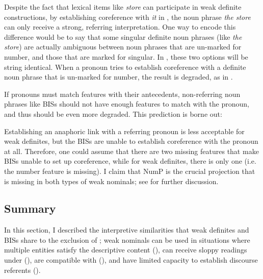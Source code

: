 \documentclass[output=paper,
modfonts
]{langscibook}
\begin{document}
Despite the fact that lexical items like \textit{store} can participate in weak definite constructions, by establishing coreference with \textit{it} in , the noun phrase \textit{the store} can only receive a strong, referring interpretation. One way to encode this difference would be to say that some singular definite noun phrases (like \textit{the store}) are actually ambiguous between noun phrases that are un-marked for number, and those that are marked for singular. In , these two options will be string identical. When a pronoun tries to establish coreference with a definite noun phrase that is un-marked for number, the result is degraded, as in .

If pronouns must match features with their antecedents, non-referring noun phrases like BISs should not have enough features to match with the pronoun, and thus should be even more degraded. This prediction is borne out:

\begin{exe}
\end{exe}

Establishing an anaphoric link with a referring pronoun is less acceptable for weak definites, but the BISs are unable to establish coreference with the pronoun at all. Therefore, one could assume that there are two missing features that make BISs unable to set up coreference, while for weak definites, there is only one (i.e. the number feature is missing). I claim that {Num}P is the crucial projection that is missing in both types of weak nominals; see  for further discussion.


\subsection{Summary}

In this section, I described the interpretive similarities that weak definites and BISs share to the exclusion of ; weak nominals can be used in situations where multiple entities satisfy the descriptive content (), can receive sloppy readings under  (), are compatible with  (), and have limited capacity to establish discourse referents ().
\end{document}
